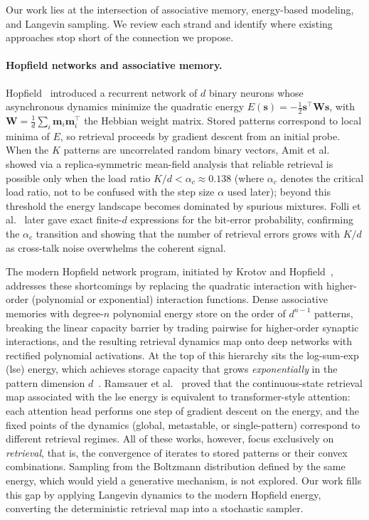 
Our work lies at the intersection of associative memory, energy-based modeling, and Langevin sampling. We review each strand and identify where existing approaches stop short of the connection we propose.

\paragraph{Hopfield networks and associative memory.}
Hopfield~\cite{hopfieldNeuralNetworksPhysical1982} introduced a recurrent network of $d$ binary neurons whose asynchronous dynamics minimize the quadratic energy $E(\mathbf{s})=-\frac{1}{2}\mathbf{s}^{\top}\mathbf{W}\mathbf{s}$, with $\mathbf{W}=\frac{1}{d}\sum_{i}\mathbf{m}_i\mathbf{m}_i^{\top}$ the Hebbian weight matrix. Stored patterns correspond to local minima of $E$, so retrieval proceeds by gradient descent from an initial probe. When the $K$ patterns are uncorrelated random binary vectors, Amit et al.~\cite{amitStoringInfiniteNumbers1985} showed via a replica-symmetric mean-field analysis that reliable retrieval is possible only when the load ratio $K/d < \alpha_c \approx 0.138$ (where $\alpha_c$ denotes the critical load ratio, not to be confused with the step size $\alpha$ used later); beyond this threshold the energy landscape becomes dominated by spurious mixtures. Folli et al.~\cite{folliMaximumStorageCapacity2017} later gave exact finite-$d$ expressions for the bit-error probability, confirming the $\alpha_c$ transition and showing that the number of retrieval errors grows with $K/d$ as cross-talk noise overwhelms the coherent signal.

The modern Hopfield network program, initiated by Krotov and Hopfield~\cite{krotovDenseAssociativeMemory2016}, addresses these shortcomings by replacing the quadratic interaction with higher-order (polynomial or exponential) interaction functions. Dense associative memories with degree-$n$ polynomial energy store on the order of $d^{n-1}$ patterns, breaking the linear capacity barrier by trading pairwise for higher-order synaptic interactions, and the resulting retrieval dynamics map onto deep networks with rectified polynomial activations. At the top of this hierarchy sits the log-sum-exp (lse) energy, which achieves storage capacity that grows \emph{exponentially} in the pattern dimension $d$~\cite{ramsauerHopfieldNetworksAll2021}. Ramsauer et al.~\cite{ramsauerHopfieldNetworksAll2021} proved that the continuous-state retrieval map associated with the lse energy is equivalent to transformer-style attention: each attention head performs one step of gradient descent on the energy, and the fixed points of the dynamics (global, metastable, or single-pattern) correspond to different retrieval regimes. All of these works, however, focus exclusively on \emph{retrieval}, that is, the convergence of iterates to stored patterns or their convex combinations. Sampling from the Boltzmann distribution defined by the same energy, which would yield a generative mechanism, is not explored. Our work fills this gap by applying Langevin dynamics to the modern Hopfield energy, converting the deterministic retrieval map into a stochastic sampler.

